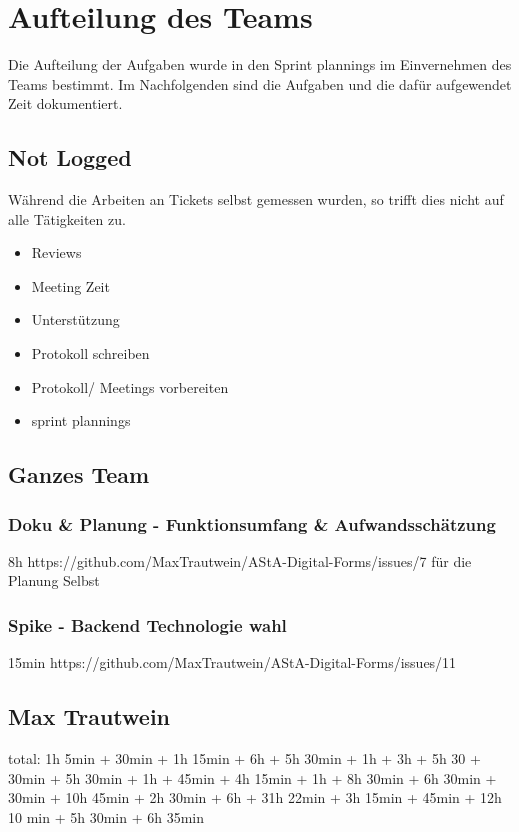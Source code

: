 \chapter{Aufteilung des Teams}\label{ch:aufteilung-des-teams}
Die Aufteilung der Aufgaben wurde in den Sprint plannings im Einvernehmen des Teams bestimmt.
Im Nachfolgenden sind die Aufgaben und die dafür aufgewendet Zeit dokumentiert.

\section{Not Logged}
Während die Arbeiten an Tickets selbst gemessen wurden, so trifft dies nicht auf alle Tätigkeiten zu.

\begin{itemize}
    \item Reviews
    \item Meeting Zeit
    \item Unterstützung
    \item Protokoll schreiben
    \item Protokoll/ Meetings vorbereiten
    \item sprint plannings
\end{itemize}

\section{Ganzes Team}

\subsection{Doku & Planung - Funktionsumfang & Aufwandsschätzung}
8h
https://github.com/MaxTrautwein/AStA-Digital-Forms/issues/7
für die Planung Selbst

\subsection{Spike - Backend Technologie wahl }
15min
https://github.com/MaxTrautwein/AStA-Digital-Forms/issues/11

\section{Max Trautwein}\label{sec:max-trautwein}

total: 1h 5min + 30min + 1h 15min + 6h + 5h 30min + 1h + 3h + 5h 30 + 30min + 5h 30min + 1h + 45min + 4h 15min + 1h
+ 8h 30min + 6h 30min + 30min + 10h 45min + 2h 30min + 6h + 31h 22min + 3h 15min + 45min + 12h 10 min + 5h 30min + 6h 35min

